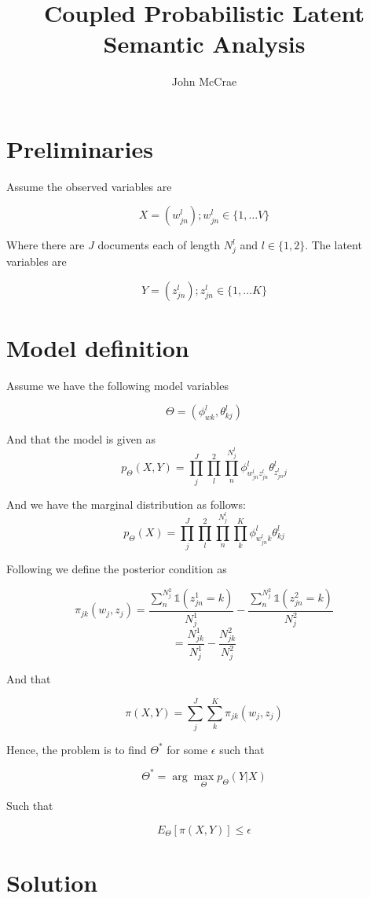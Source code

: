 \documentclass[a4paper,10pt]{article}
\title{Coupled Probabilistic Latent Semantic Analysis}
\author{John McCrae}
\begin{document}
\maketitle

\section{Preliminaries}

Assume the observed variables are

\[
 X = ( w^l_{jn} ) ; w^l_{jn} \in \{ 1,\ldots V \}
\]

Where there are $J$ documents each of length $N^l_j$ and $l \in \{1,2\}$. The
latent variables are

\[
 Y = ( z^l_{jn} ) ; z^l_{jn} \in \{ 1,\ldots K \}
\]

\section{Model definition}

Assume we have the following model variables

\[
 \Theta = ( \phi^l_{wk}, \theta^l_{kj} )
\]

And that the model is given as 
\[
 p_\Theta(X,Y) = \prod_j^J\prod_l^2\prod_n^{N^l_j}
\phi^l_{w^l_{jn}z^l_{jn}}\theta^l_{z^l_{jn}j}
\]

And we have the marginal distribution as follows:
\[
 p_\Theta(X) = \prod_j^J\prod_l^2\prod_n^{N^l_j}\prod_k^K
\phi^l_{w^l_{jn}k}\theta^l_{kj}
\]

Following \cite{platt} we define the posterior condition as 

\[
 \pi_{jk}(w_j,z_j) = \frac{\sum_n^{N^2_j} \mathds{1}(z^1_{jn} = k)}{N^1_j} - 
  \frac{\sum_n^{N_j^2} \mathds{1}(z^2_{jn} = k)}{N^2_j}
\]
\[
  = \frac{N^1_{jk}}{N^1_j} - \frac{N^2_{jk}}{N^2_j}
\]

And that

\[
 \pi(X,Y) = \sum_j^J\sum_k^K \pi_{jk}(w_j,z_j)
\]

Hence, the problem is to find $\Theta^*$ for some $\epsilon$ such that

\[
 \Theta^* = \arg\max_\Theta p_\Theta(Y|X)
\]

Such that

\[
 E_\Theta[\pi(X,Y)] \leq \epsilon
\]

\section{Solution}
\end{document}

